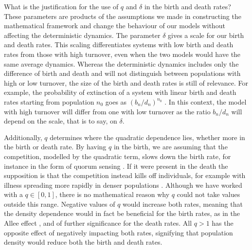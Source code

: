 \documentclass[a4paper,10pt]{article}
\numberwithin{equation}{section} %
\begin{document}
What is the justification for the use of $q$ and $\delta$ in the birth and death rates? 
These parameters are products of the assumptions we made in constructing the mathematical framework and change the behaviour of our models without affecting the deterministic dynamics.
The parameter $\delta$ gives a scale for our birth and death rates.
This scaling differentiates systems with low birth and death rates from those with high turnover, even when the two models would have the same average dynamics. 
Whereas the deterministic dynamics includes only the difference of birth and death and will not distinguish between populations with high or low turnover, the size of the birth and death rates is still of relevance. 
For example, the probability of extinction of a system with linear birth and death rates starting from population $n_0$ goes as $(b_n/d_n)^{n_0}$ \cite{Nisbet1982}.
In this context, the model with high turnover will differ from one with low turnover as the ratio $b_n/d_n$ will depend on the scale, that is to say, on $\delta$. 

Additionally, $q$ determines where the quadratic dependence lies, whether more in the birth or death rate. 
By having $q$ in the birth, we are assuming that the competition, modelled by the quadratic term, slows down the birth rate, for instance in the form of quorum sensing \cite{Nadell2008}. %
If it were present in the death the supposition is that the competition instead kills off individuals, for example with illness spreading more rapidly in denser populations \cite{}.
Although we have worked with a $q \in [0,1]$, there is no mathematical reason why $q$ could not take values outside this range. 
Negative values of $q$ would increase both rates, meaning that the density dependence would in fact be beneficial for the birth rates, as in the Allee effect \cite{}, and of further significance for the death rates. 
All $q>1$ has the opposite effect of negatively impacting both rates, signifying that population density would reduce both the birth and death rates. %
\end{document}
